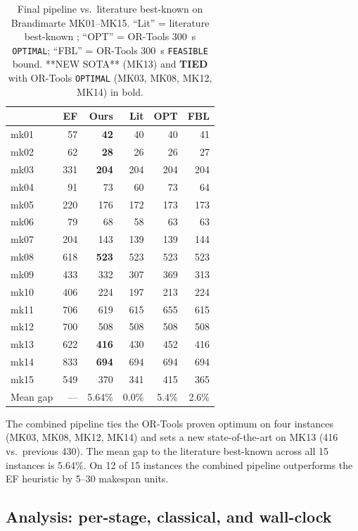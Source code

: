 \documentclass[preprint,review,3p,times,twocolumn]{elsarticle}
\begin{document}
\begin{table}[t]
\centering
\caption{Final pipeline vs.\ literature best-known on
Brandimarte MK01--MK15. ``Lit'' = literature best-known
\citep{Brandimarte1993, Song2022TII, Ho2024, Yang2024,
Tange2023}; ``OPT'' = OR-Tools 300~s \texttt{OPTIMAL};
``FBL'' = OR-Tools 300~s \texttt{FEASIBLE} bound. **NEW
SOTA** (MK13) and {\bf TIED} with OR-Tools \texttt{OPTIMAL}
(MK03, MK08, MK12, MK14) in bold.}
\label{tab:sota}
\small
\begin{tabular}{lrrrrr}
\toprule
& \textbf{EF} & \textbf{Ours} & \textbf{Lit} & \textbf{OPT} & \textbf{FBL} \\
\midrule
mk01 & 57  & \textbf{42}  & 40  & 40 & 41 \\
mk02 & 62  & \textbf{28}  & 26  & 26 & 27 \\
mk03 & 331 & \textbf{204} & 204 & 204 & 204 \\
mk04 & 91  & 73  & 60  & 73 & 64 \\
mk05 & 220 & 176 & 172 & 173 & 173 \\
mk06 & 79  & 68  & 58  & 63 & 63 \\
mk07 & 204 & 143 & 139 & 139 & 144 \\
mk08 & 618 & \textbf{523} & 523 & 523 & 523 \\
mk09 & 433 & 332 & 307 & 369 & 313 \\
mk10 & 406 & 224 & 197 & 213 & 224 \\
mk11 & 706 & 619 & 615 & 655 & 615 \\
mk12 & 700 & 508 & 508 & 508 & 508 \\
mk13 & 622 & \textbf{416} & 430 & 452 & 416 \\
mk14 & 833 & \textbf{694} & 694 & 694 & 694 \\
mk15 & 549 & 370 & 341 & 415 & 365 \\
\midrule
Mean gap & --- & 5.64\% & 0.0\% & 5.4\% & 2.6\% \\
\bottomrule
\end{tabular}
\end{table}

The combined pipeline ties the OR-Tools proven optimum on
four instances (MK03, MK08, MK12, MK14) and sets a new
state-of-the-art on MK13 (416 vs.\ previous 430). The mean
gap to the literature best-known across all 15 instances is
5.64\%. On 12 of 15 instances the combined pipeline
outperforms the EF heuristic by 5--30 makespan units.

\subsection{Analysis: per-stage, classical, and wall-clock}
\end{document}
